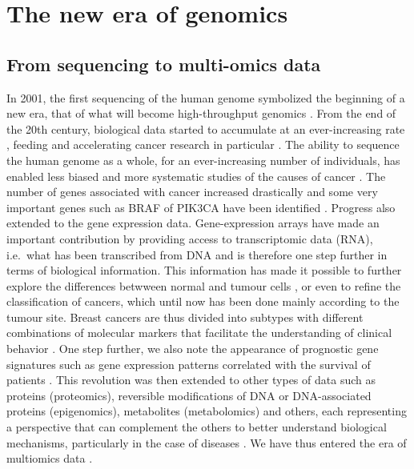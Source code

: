 \documentclass[a4paper,12pt,twoside,onecolumn,openright,final,oldfontcommands]{memoir}
\begin{document}
\section{The new era of genomics}\label{the-new-era-of-genomics}

\subsection{From sequencing to multi-omics
data}\label{from-sequencing-to-multi-omics-data}

In 2001, the first sequencing of the human genome symbolized the
beginning of a new era, that of what will become high-throughput
genomics \citep{lander2001initial, venter2001sequence}. From the end of
the 20th century, biological data started to accumulate at an
ever-increasing rate \citep{reuter2015high}, feeding and accelerating
cancer research in particular
\citep{stratton2009cancer, meyerson2010advances}. The ability to
sequence the human genome as a whole, for an ever-increasing number of
individuals, has enabled less biased and more systematic studies of the
causes of cancer \citep{lander2011initial}. The number of genes
associated with cancer increased drastically and some very important
genes such as BRAF of PIK3CA have been identified
\citep{davies2002mutations, samuels2004high}. Progress also extended to
the gene expression data. Gene-expression arrays have made an important
contribution by providing access to transcriptomic data (RNA), i.e.~what
has been transcribed from DNA and is therefore one step further in terms
of biological information. This information has made it possible to
further explore the differences betwween normal and tumour cells
\citep{perou1999distinctive}, or even to refine the classification of
cancers, which until now has been done mainly according to the tumour
site. Breast cancers are thus divided into subtypes with different
combinations of molecular markers that facilitate the understanding of
clinical behavior \citep{perou2000molecular}. One step further, we also
note the appearance of prognostic gene signatures such as gene
expression patterns correlated with the survival of patients
\citep{van2002gene}. This revolution was then extended to other types of
data such as proteins (proteomics), reversible modifications of DNA or
DNA-associated proteins (epigenomics), metabolites (metabolomics) and
others, each representing a perspective that can complement the others
to better understand biological mechanisms, particularly in the case of
diseases \citep{hasin2017multi}. We have thus entered the era of
multiomics data \citep{vucic2012translating}.
\end{document}
